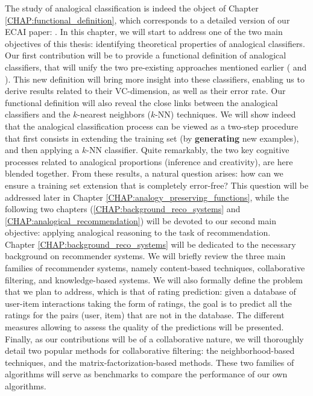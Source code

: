The study of analogical classification is indeed the object of Chapter
\ref{CHAP:functional_definition}, which corresponds to a detailed version of our
ECAI paper: \cite{HugPraRicSerECAI16}. In this chapter, we will start to
address one of the two main objectives of this thesis: identifying theoretical
properties of analogical classifiers. Our first contribution will be to provide
a functional definition of analogical classifiers, that will unify the two
pre-existing approaches mentioned earlier (\cite{StrYvoCNLL05} and
\cite{BayMicDelIJCAI07}). This new definition will bring more
insight into these classifiers, enabling us to derive results related to their
VC-dimension, as well as their error rate. Our functional definition will also
reveal the close links between the analogical classifiers and the $k$-nearest
neighbors ($k$-NN) techniques. We will show indeed that the analogical
classification process can be viewed as a two-step procedure that first
consists in extending the training
set (by \textbf{generating} new examples), and then applying a $k$-NN
classifier. Quite remarkably, the two key cognitive processes related to
analogical proportions (inference and creativity),
are here blended together. From these results, a natural question arises: how
can we ensure a training set extension that is completely error-free? This
question will be addressed later in Chapter
\ref{CHAP:analogy_preserving_functions}, while the  following two chapters
(\ref{CHAP:background_reco_systems} and \ref{CHAP:analogical_recommendation})
will be devoted to our second main objective: applying analogical reasoning to
the task of recommendation.\\

Chapter \ref{CHAP:background_reco_systems} will be dedicated to the necessary
background on recommender systems. We will briefly review the three main
families of recommender systems, namely content-based techniques, collaborative
filtering, and knowledge-based systems. We will also formally define the
problem that we plan to address, which is that of rating prediction: given a
database of  user-item interactions taking the form of ratings, the goal is to
predict all the ratings for the pairs (user, item) that are not in the
database. The different measures allowing to assess the quality of the
predictions will be presented. Finally, as our contributions will be of a
collaborative nature, we will thoroughly detail two popular methods for
collaborative filtering: the neighborhood-based techniques, and the
matrix-factorization-based methods. These two families of algorithms will serve
as benchmarks to compare the performance of our own algorithms.\\

